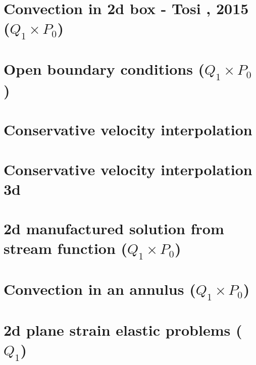 \documentclass[a4paper,11pt]{report}
\begin{document}
\chapter{Convection in 2d box - Tosi \etal, 2015 ($Q_1\times P_0$) \label{f28}} %

\chapter{Open boundary conditions ($Q_1\times P_0$)\label{f29}} %

\chapter{Conservative velocity interpolation \label{f30}} %

\chapter{Conservative velocity interpolation 3d \label{f31}} %

\chapter{2d manufactured solution from stream function ($Q_1\times P_0$)\label{f32}} %

\chapter{Convection in an annulus  ($Q_1\times P_0$)  \label{f33}} %

\chapter{2d plane strain elastic problems ($Q_1$)\label{f34}} %
\end{document}
